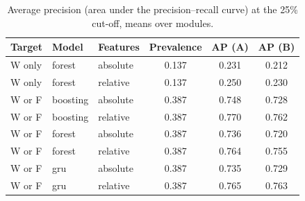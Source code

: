 \begin{table}[!ht]
\centering
\caption{Average precision (area under the precision--recall curve) at the 25\% cut-off, means over modules.}
\label{tab:s-ap}
\footnotesize
\begin{tabular}{@{}lllccc@{}}
\toprule
Target & Model & Features & Prevalence & AP (A) & AP (B) \\
\midrule
W only & forest & absolute & 0.137 & 0.231 & 0.212 \\
W only & forest & relative & 0.137 & 0.250 & 0.230 \\
W or F & boosting & absolute & 0.387 & 0.748 & 0.728 \\
W or F & boosting & relative & 0.387 & 0.770 & 0.762 \\
W or F & forest & absolute & 0.387 & 0.736 & 0.720 \\
W or F & forest & relative & 0.387 & 0.764 & 0.755 \\
W or F & gru & absolute & 0.387 & 0.735 & 0.729 \\
W or F & gru & relative & 0.387 & 0.765 & 0.763 \\
\bottomrule
\end{tabular}
\end{table}
